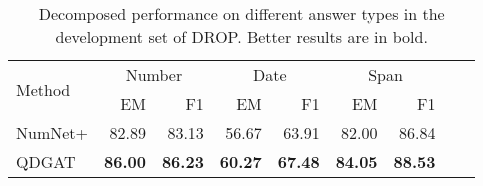 \documentclass{article}
\begin{document}
\begin{table}[t]
\caption{Decomposed performance on different answer types in the development set of DROP. Better results are in bold.}
\label{category-results-drop-table}
\vskip 0.12in
\begin{center}
\begin{scriptsize}
\begin{tabularx}{\linewidth}{lrrrrrrrr}
\toprule
\multirow{2}{*}{Method} & \multicolumn{2}{c}{Number}  & \multicolumn{2}{c}{Date} & \multicolumn{2}{c}{Span} \\ \cmidrule(lr){2-3} \cmidrule(lr){4-5} \cmidrule(lr){6-7}
       & EM  & F1 & EM & F1 & EM & F1  \\
\midrule
NumNet+ & 82.89 & 83.13 & 56.67 & 63.91 & 82.00 & 86.84 \\
QDGAT & \textbf{86.00} & \textbf{86.23} & \textbf{60.27} & \textbf{67.48} & \textbf{84.05} & \textbf{88.53}\\
\bottomrule
\end{tabularx}
\end{scriptsize}
\end{center}
\vskip -0.1in
\end{table}
\end{document}
